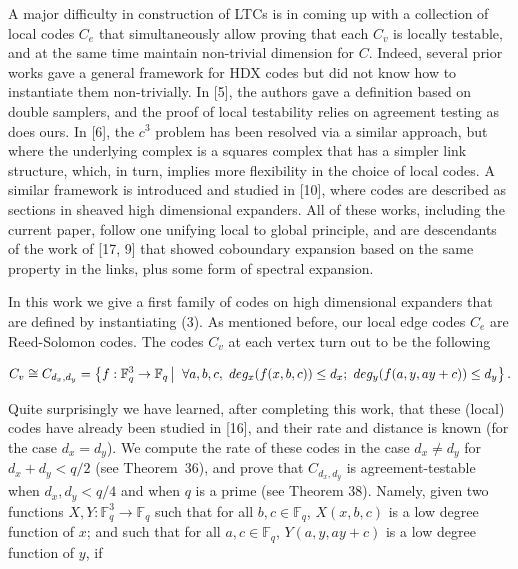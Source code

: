A major difficulty in construction of LTCs is in coming up with a collection of local codes $C_{e}$ that simultaneously allow proving that each $C_{v}$ is locally testable, and at the same time maintain non-trivial dimension for $C$.
Indeed, several prior works gave a general framework for HDX codes but did not know how to instantiate them non-trivially. In [5], the authors gave a definition based on double samplers, and the proof of local testability relies on agreement testing as does ours. In [6], the $c^{3}$ problem has been resolved via a similar approach, but where the underlying complex is a squares complex that has a simpler link structure, which, in turn, implies more flexibility in the choice of local codes. A similar framework is introduced and studied in [10], where codes are described as sections in sheaved high dimensional expanders. All of these works, including the current paper, follow one unifying local to global principle, and are descendants of the work of [17, 9] that showed coboundary expansion based on the same property in the links, plus some form of spectral expansion.\par




In this work we give a first family of codes on high dimensional expanders that are defined by instantiating (3). As mentioned before, our local edge codes $C_{e}$ are Reed-Solomon codes. The codes $C_{v}$ at each vertex turn out to be the following\par


\[\begin{gathered}
C_{v}\cong C_{d_{x},d_{y}}=\left\{f:\mathbb{F}_{q}^{3}\to\mathbb{F}_{q}\left|\;\vphantom{f:\mathbb{F}_{q}^{3}\to\mathbb{F}_{q}\forall a,b,c,\,\,deg_{x}(f(x,b,c))\leq d_{x};\,\,deg_{y}(f(a,y,ay+c))\leq d_{y}}\right.\forall a,b,c,\,\,deg_{x}(f(x,b,c))\leq d_{x};\,\,deg_{y}(f(a,y,ay+c))\leq d_{y}\right\}.
\end{gathered}\]


Quite surprisingly we have learned, after completing this work, that these (local) codes have already been studied in [16], and their rate and distance is known (for the case $d_{x}=d_{y}$). We compute the rate of these codes in the case $d_{x}\not=d_{y}$ for $d_{x}+d_{y}<q/2$ (see Theorem 36), and prove that $C_{d_{x},d_{y}}$ is agreement-testable when $d_{x},d_{y}<q/4$ and when $q$ is a prime (see Theorem 38). Namely, given two functions $X,Y:\mathbb{F}_{q}^{3}\to\mathbb{F}_{q}$ such that
for all $b,c\in\mathbb{F}_{q}$, $X(x,b,c)$ is a low degree function of $x$; and such that for all $a,c\in\mathbb{F}_{q}$, $Y(a,y,ay+c)$ is a low degree function of $y$, if\par


